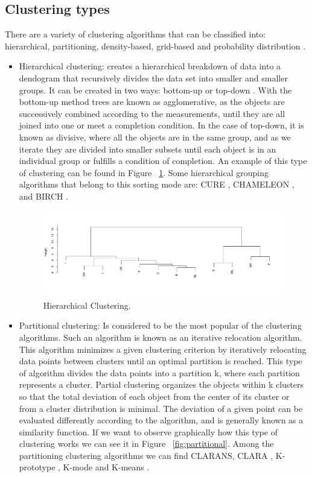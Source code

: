 \subsection{Clustering types}

There are a variety of clustering algorithms that can be classified into: hierarchical, partitioning, density-based, grid-based and probability distribution \citep{R:patibandla-lakshmi-veeranjaneyulu:2018}.
\\
\begin{itemize}
  \item Hierarchical clustering: creates a hierarchical breakdown of data into a dendogram that recursively divides the data set into smaller and smaller groups. It can be created in two ways: bottom-up or top-down \citep{R:jain-murty-flynn:1999}. With the bottom-up method trees are known as agglomerative, as the objects are successively combined according to the measurements, until they are all joined into one or meet a completion condition. In the case of top-down, it is known as divisive, where all the objects are in the same group, and as we iterate they are divided into smaller subsets until each object is in an individual group or fulfills a condition of completion. An example of this type of clustering can be found in Figure ~\ref{fig:hierarchical}. Some hierarchical grouping algorithms that belong to this sorting mode are: CURE \citep{R:guha-rastogi-shim:2001}, CHAMELEON \citep{R:dongwei-jingjing-jici:2019}, and BIRCH \citep{R:tian-raghu-miron:1996}.
\begin{figure}[htbp]
  \centering
   \includegraphics[width=0.9\linewidth, height=0.2\textheight]{img/hierarchical.pdf}
    \caption{Hierarchical Clustering.}
    \label{fig:hierarchical}%
\end{figure}
  \item Partitional clustering: Is considered to be the most popular of the clustering algorithms. Such an algorithm is known as an iterative relocation algorithm. This algorithm minimizes a given clustering criterion by iteratively relocating data points between clusters until an optimal partition is reached. This type of algorithm divides the data points into a partition k, where each partition represents a cluster. Partial clustering organizes the objects within k clusters so that the total deviation of each object from the center of its cluster or from a cluster distribution is minimal. The deviation of a given point can be evaluated differently according to the algorithm, and is generally known as a similarity function. If we want to observe graphically how this type of clustering works we can see it in Figure ~\ref{fig:partitional}. Among the partitioning clustering algorithms we can find CLARANS, CLARA \citep{R:h-a:2019}, K-prototype \citep{R:nithya-prabha:2019}, K-mode \citep{R:huang:1997} and K-means \citep{R:mohit-himanshu-chetan:2020}.

\end{itemize}
